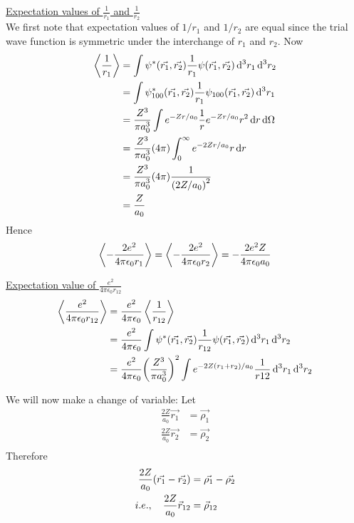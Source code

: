 	\underline{Expectation values of $\frac{1}{r_1}$ and $\frac{1}{r_2}$}\\
	We first note that expectation values of $1/r_1$ and $1/r_2$ are equal since the trial wave function is symmetric under the interchange of $r_1$ and $r_2$. Now
	\begin{align*}
		\expval{\frac{1}{r_1}} 
		&= \int \psi^*\qty(\vec{r_1}, \vec{r_2}) \frac{1}{r_1} \psi\qty(\vec{r_1}, \vec{r_2}) \dd[3]{r_1} \dd[3]{r_2} \\
		&= \int \psi^*_{1 0 0}\qty(\vec{r_1}, \vec{r_2}) \frac{1}{r_1} \psi_{1 0 0}\qty(\vec{r_1}, \vec{r_2}) \dd[3]{r_1} \\
		&= \frac{Z^3}{\pi a_0^3} \int e^{-Z r/a_0} \frac{1}{r} e^{-Z r/a_0} r^2 \dd{r} \dd{\Omega}\\
		&= \frac{Z^3}{\pi a_0^3} \qty(4\pi) \int_{0}^{\infty} e^{-2Z r/a_0} r \dd{r} \\
		&= \frac{Z^3}{\pi a_0^3} \qty(4\pi) \frac{1}{\qty(2 Z / a_0)^2}\\
		&= \frac{Z}{a_0}
	\end{align*}
	Hence
	\begin{align}
		\expval{-\frac{2 e^2}{4\pi \epsilon_0 r_1}} = \expval{-\frac{2 e^2}{4\pi \epsilon_0 r_2}} = - \frac{2 e^2 Z}{4\pi \epsilon_0 a_0}
		\label{chapter21.eqn3-example-helium}
	\end{align}
	
	\underline{Expectation value of $\frac{e^2}{4\pi \epsilon_0 r_{1 2}}$}
	\begin{align}
		\expval{\frac{e^2}{4\pi \epsilon_0 r_{1 2}}} &= \frac{e^2}{4\pi \epsilon_0} \expval{\frac{1}{r_{1 2}}} \\
		&= \frac{e^2}{4\pi \epsilon_0} \int \psi^*\qty(\vec{r_1}, \vec{r_2}) \frac{1}{r_{1 2}} \psi\qty(\vec{r_1}, \vec{r_2}) \dd[3]{r_1} \dd[3]{r_2} \\
		&= \frac{e^2}{4\pi \epsilon_0} \qty(\frac{Z^3}{\pi a_0^3})^{2} \int e^{-2 Z \qty(r_1 + r_2)/a_0} \frac{1}{r{1 2}} \dd[3]{r_1} \dd[3]{r_2}
	\end{align}
	
	We will now make a change of variable:
	Let
	\begin{align*}
		\frac{2 Z}{a_0} \vec{r_1} &= \vec{\rho_1} \\
		\frac{2 Z}{a_0} \vec{r_2} &= \vec{\rho_2} \\
	\end{align*}
	Therefore
	\begin{align*}
		\frac{2 Z}{a_0} \qty(\vec{r_1} - \vec{r_2}) &= \vec{\rho_1}  -  \vec{\rho_2} \\
		i.e., \quad \frac{2 Z}{a_0} \vec{r}_{12} &= \vec{\rho}_{12}
	\end{align*}

